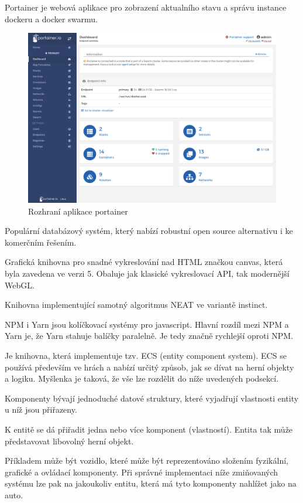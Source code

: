 Portainer je webová aplikace pro zobrazení aktualního stavu a správu instance dockeru a docker swarmu.

\begin{figure}[H]
	\centering
	\includegraphics[width=0.7\linewidth]{portainer}
	\caption{Rozhraní aplikace portainer}
	\label{fig:portainer}
\end{figure}


Populární databázový systém, který nabízí robustní open source alternativu i ke komerčním řešením.

Grafická knihovna pro snadné vykreslování nad HTML značkou canvas, která byla zavedena ve verzi 5. Obaluje jak klasické vykreslovací API, tak modernější WebGL.

Knihovna implementující samotný algoritmus NEAT ve variantě instinct.

NPM i Yarn jsou kolíčkovací systémy pro javascript. Hlavní rozdíl mezi NPM a Yarn je, že Yarn stahuje balíčky paralelně. Je tedy značně rychlejší oproti NPM. 

\label{sec:ces}
Je knihovna, která implementuje tzv. ECS (entity component system). ECS se používá především ve hrách a nabízí určitý způsob, jak se dívat na herní objekty a logiku. Myšlenka je taková, že vše lze rozdělit do níže uvedených podsekcí.

Komponenty bývají jednoduché datové struktury, které vyjadřují vlastnosti entity u níž jsou přiřazeny.

K entitě se dá přiřadit jedna nebo více komponent (vlastností). Entita tak může představovat libovolný herní objekt. 

Příkladem může být vozidlo, které může být reprezentováno složením fyzikální, grafické a ovládací komponenty. Při správné implementaci níže zmiňovaných systému lze pak na jakoukoliv entitu, která má tyto komponenty nahlížet jako na auto.

